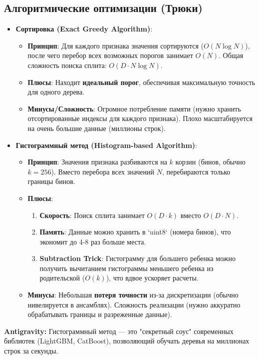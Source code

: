 \documentclass[12pt]{article}
\newcommand{\antigravity}[1]{{\small\color{antigravityblue}\textbf{Antigravity:} #1}}
\begin{document}
\subsection{Алгоритмические оптимизации (Трюки)}

\begin{itemize}
    \item \textbf{Сортировка (Exact Greedy Algorithm)}:
    \begin{itemize}
        \item \textbf{Принцип}: Для каждого признака значения сортируются ($O(N \log N)$), после чего перебор всех возможных порогов занимает $O(N)$. Общая сложность поиска сплита: $O(D \cdot N \log N)$.
        \item \textbf{Плюсы}: Находит \textbf{идеальный порог}, обеспечивая максимальную точность для одного дерева.
        \item \textbf{Минусы/Сложность}: Огромное потребление памяти (нужно хранить отсортированные индексы для каждого признака). Плохо масштабируется на очень большие данные (миллионы строк).
    \end{itemize}
    
    \item \textbf{Гистограммный метод (Histogram-based Algorithm)}:
    \begin{itemize}
        \item \textbf{Принцип}: Значения признака разбиваются на $k$ корзин (бинов, обычно $k=256$). Вместо перебора всех значений $N$, перебираются только границы бинов. 
        \item \textbf{Плюсы}: 
            \begin{enumerate}
                \item \textbf{Скорость}: Поиск сплита занимает $O(D \cdot k)$ вместо $O(D \cdot N)$.
                \item \textbf{Память}: Данные можно хранить в `uint8` (номера бинов), что экономит до 4-8 раз больше места.
                \item \textbf{Subtraction Trick}: Гистограмму для большего ребенка можно получить вычитанием гистограммы меньшего ребенка из родительской ($O(k)$), что вдвое ускоряет расчеты.
            \end{enumerate}
        \item \textbf{Минусы}: Небольшая \textbf{потеря точности} из-за дискретизации (обычно нивелируется в ансамблях). Сложность реализации (нужно аккуратно обрабатывать границы и разреженные данные).
    \end{itemize}
\end{itemize}

\antigravity{Гистограммный метод — это "секретный соус" современных библиотек (LightGBM, CatBoost), позволяющий обучать деревья на миллионах строк за секунды.}
\end{document}
